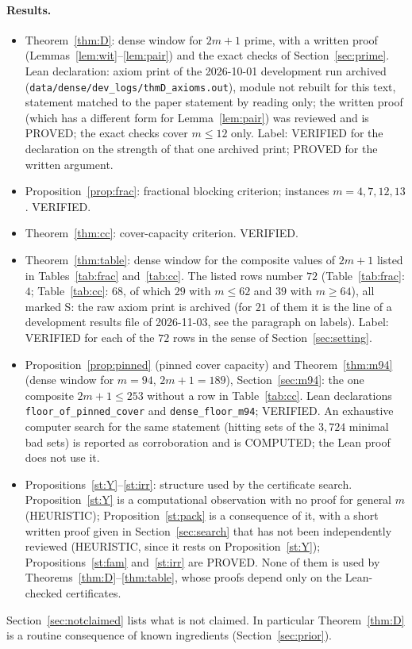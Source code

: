 \documentclass[11pt]{article}
\theoremstyle{remark}
\begin{document}
\paragraph{Results.}
\begin{itemize}
\item Theorem~\ref{thm:D}: dense window for $2m+1$ prime, with a written proof (Lemmas~\ref{lem:wit}--\ref{lem:pair}) and the exact checks of Section~\ref{sec:prime}. Lean declaration: axiom print of the 2026-10-01 development run archived (\texttt{data/dense/dev\_logs/thmD\_axioms.out}), module not rebuilt for this text, statement matched to the paper statement by reading only; the written proof (which has a different form for Lemma~\ref{lem:pair}) was reviewed and is PROVED; the exact checks cover $m\le12$ only. Label: VERIFIED for the declaration on the strength of that one archived print; PROVED for the written argument.
\item Proposition~\ref{prop:frac}: fractional blocking criterion; instances $m=4,7,12,13$. VERIFIED.
\item Theorem~\ref{thm:cc}: cover-capacity criterion. VERIFIED.
\item Theorem~\ref{thm:table}: dense window for the composite values of $2m+1$ listed in Tables~\ref{tab:frac} and~\ref{tab:cc}. The listed rows number $72$ (Table~\ref{tab:frac}: $4$; Table~\ref{tab:cc}: $68$, of which $29$ with $m\le62$ and $39$ with $m\ge64$), all marked S: the raw axiom print is archived (for $21$ of them it is the line of a development results file of 2026-11-03, see the paragraph on labels). Label: VERIFIED for each of the $72$ rows in the sense of Section~\ref{sec:setting}.
\item Proposition~\ref{prop:pinned} (pinned cover capacity) and Theorem~\ref{thm:m94} (dense window for $m=94$, $2m+1=189$), Section~\ref{sec:m94}: the one composite $2m+1\le253$ without a row in Table~\ref{tab:cc}. Lean declarations \texttt{floor\_of\_pinned\_cover} and \texttt{dense\_floor\_m94}; VERIFIED. An exhaustive computer search for the same statement (hitting sets of the $3{,}724$ minimal bad sets) is reported as corroboration and is COMPUTED; the Lean proof does not use it.
\item Propositions~\ref{st:Y}--\ref{st:irr}: structure used by the certificate search. Proposition~\ref{st:Y} is a computational observation with no proof for general $m$ (HEURISTIC); Proposition~\ref{st:pack} is a consequence of it, with a short written proof given in Section~\ref{sec:search} that has not been independently reviewed (HEURISTIC, since it rests on Proposition~\ref{st:Y}); Propositions~\ref{st:fam} and~\ref{st:irr} are PROVED. None of them is used by Theorems~\ref{thm:D}--\ref{thm:table}, whose proofs depend only on the Lean-checked certificates.
\end{itemize}
Section~\ref{sec:notclaimed} lists what is not claimed. In particular Theorem~\ref{thm:D} is a routine consequence of known ingredients (Section~\ref{sec:prior}).
\end{document}

